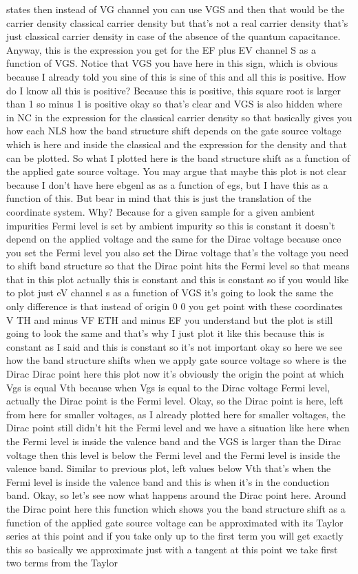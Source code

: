 states then instead of VG channel you can use VGS and then that would be the carrier density classical carrier density but that's not a real carrier density that's just classical carrier density in case of the absence of the quantum capacitance. Anyway, this is the expression you get for the EF plus EV channel S as a function of VGS. Notice that VGS you have here in this sign, which is obvious because I already told you sine of this is sine of this and all this is positive. How do I know all this is positive? Because this is positive, this square root is larger than 1 so minus 1 is positive okay so that's clear and VGS is also hidden where in NC in the expression for the classical carrier density so that basically gives you how each NLS how the band structure shift depends on the gate source voltage which is here and inside the classical and the expression for the density and that can be plotted. So what I plotted here is the band structure shift as a function of the applied gate source voltage. You may argue that maybe this plot is not clear because I don't have here ebgenl as as a function of egs, but I have this as a function of this. But bear in mind that this is just the translation of the coordinate system. Why? Because for a given sample for a given ambient impurities Fermi level is set by ambient impurity so this is constant it doesn't depend on the applied voltage and the same for the Dirac voltage because once you set the Fermi level you also set the Dirac voltage that's the voltage you need to shift band structure so that the Dirac point hits the Fermi level so that means that in this plot actually this is constant and this is constant so if you would like to plot just eV channel s as a function of VGS it's going to look the same the only difference is that instead of origin 0 0 you get point with these coordinates V TH and minus VF ETH and minus EF you understand but the plot is still going to look the same and that's why I just plot it like this because this is constant as I said and this is constant so it's not important okay so here we see how the band structure shifts when we apply gate source voltage so where is the Dirac Dirac point here this plot now it's obviously the origin the point at which Vgs is equal Vth because when Vgs is equal to the Dirac voltage Fermi level, actually the Dirac point is the Fermi level. Okay, so the Dirac point is here, left from here for smaller voltages, as I already plotted here for smaller voltages, the Dirac point still didn't hit the Fermi level and we have a situation like here when the Fermi level is inside the valence band and the VGS is larger than the Dirac voltage then this level is below the Fermi level and the Fermi level is inside the valence band. Similar to previous plot, left values below Vth that's when the Fermi level is inside the valence band and this is when it's in the conduction band. Okay, so let's see now what happens around the Dirac point here. Around the Dirac point here this function which shows you the band structure shift as a function of the applied gate source voltage can be approximated with its Taylor series at this point and if you take only up to the first term you will get exactly this so basically we approximate just with a tangent at this point we take first two terms from the Taylor 